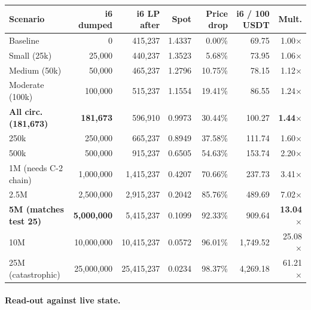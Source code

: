 \documentclass[11pt,a4paper]{article}
\begin{document}
\begin{center}
\renewcommand{\arraystretch}{1.25}
\footnotesize
\begin{tabular}{p{3.0cm} r r r r r r}
\toprule
\textbf{Scenario} & \textbf{i6 dumped} & \textbf{i6 LP after}
                  & \textbf{Spot}      & \textbf{Price drop}
                  & \textbf{i6 / 100 USDT} & \textbf{Mult.} \\
\midrule
Baseline                  &           0 &     415{,}237 & 1.4337 &  0.00\% &   69.75 &  1.00$\times$ \\
Small (25k)               &      25{,}000 &     440{,}237 & 1.3523 &  5.68\% &   73.95 &  1.06$\times$ \\
Medium (50k)              &      50{,}000 &     465{,}237 & 1.2796 & 10.75\% &   78.15 &  1.12$\times$ \\
Moderate (100k)           &     100{,}000 &     515{,}237 & 1.1554 & 19.41\% &   86.55 &  1.24$\times$ \\
\textbf{All circ. (181{,}673)}
                          &  \textbf{181{,}673} &     596{,}910 & 0.9973 & 30.44\% &  100.27 & \textbf{1.44}$\times$ \\
250k                      &     250{,}000 &     665{,}237 & 0.8949 & 37.58\% &  111.74 &  1.60$\times$ \\
500k                      &     500{,}000 &     915{,}237 & 0.6505 & 54.63\% &  153.74 &  2.20$\times$ \\
1M (needs C-2 chain)      &  1{,}000{,}000 &  1{,}415{,}237 & 0.4207 & 70.66\% &  237.73 &  3.41$\times$ \\
2.5M                      &  2{,}500{,}000 &  2{,}915{,}237 & 0.2042 & 85.76\% &  489.69 &  7.02$\times$ \\
\textbf{5M (matches test 25)}
                          &  \textbf{5{,}000{,}000} &  5{,}415{,}237 & 0.1099 & 92.33\% &  909.64 & \textbf{13.04}$\times$ \\
10M                       & 10{,}000{,}000 & 10{,}415{,}237 & 0.0572 & 96.01\% & 1{,}749.52 & 25.08$\times$ \\
25M (catastrophic)        & 25{,}000{,}000 & 25{,}415{,}237 & 0.0234 & 98.37\% & 4{,}269.18 & 61.21$\times$ \\
\bottomrule
\end{tabular}
\end{center}

\paragraph{Read-out against live state.}
\end{document}
